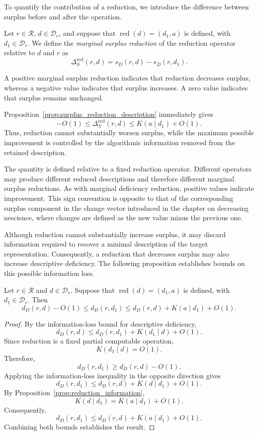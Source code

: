 To quantify the contribution of a reduction, we introduce the difference between surplus before and after the operation.

\begin{definition}
\label{def:marginal_surplus_reduction}
Let $r\in\mathcal R$, $d\in\mathcal D_r$, and suppose that $\operatorname{red}(d)=(d_1,a)$ is defined, with $d_1\in\mathcal D_r$. We define the \emph{marginal surplus reduction}  of the reduction operator relative to $d$ and $r$ as
\[
\Delta_S^{\mathrm{red}}(r,d) = s_D(r,d)-s_D(r,d_1).
\]
\end{definition}

A positive marginal surplus reduction indicates that reduction decreases surplus, whereas a negative value indicates that surplus increases. A zero value indicates that surplus remains unchanged.

Proposition~\ref{prop:surplus_reduction_description} immediately gives
\[
-O(1) \leq \Delta_S^{\mathrm{red}}(r,d) \leq K(a\mid d_1)+O(1).
\]
Thus, reduction cannot substantially worsen surplus, while the maximum possible improvement is controlled by the algorithmic information removed from the retained description.

The quantity is defined relative to a fixed reduction operator. Different operators may produce different reduced descriptions and therefore different marginal surplus reductions. As with marginal deficiency reduction, positive values indicate improvement. This sign convention is opposite to that of the corresponding surplus component in the change vector introduced in the chapter on decreasing nescience, where changes are defined as the new value minus the previous one.

Although reduction cannot substantially increase surplus, it may discard information required to recover a minimal description of the target representation. Consequently, a reduction that decreases surplus may also increase descriptive deficiency. The following proposition establishes bounds on this possible information loss.

\begin{proposition}
\label{prop:reduction_deficiency_bound}
Let $r\in\mathcal R$ and $d\in\mathcal D_r$. Suppose that $\operatorname{red}(d)=(d_1,a)$ is defined, with $d_1\in\mathcal D_r$. Then
\[
d_D(r,d)-O(1) \leq d_D(r,d_1) \leq d_D(r,d)+K(a\mid d_1)+O(1).
\]
\end{proposition}
\begin{proof}
By the information-loss bound for descriptive deficiency,
\[
d_D(r,d) \leq d_D(r,d_1)+K(d_1\mid d)+O(1).
\]
Since reduction is a fixed partial computable operation,
\[
K(d_1\mid d)=O(1).
\]
Therefore,
\[
d_D(r,d_1)\geq d_D(r,d)-O(1).
\]
Applying the information-loss inequality in the opposite direction gives
\[
d_D(r,d_1) \leq d_D(r,d)+K(d\mid d_1)+O(1).
\]
By Proposition~\ref{prop:reduction_information},
\[
K(d\mid d_1)=K(a\mid d_1)+O(1).
\]
Consequently,
\[
d_D(r,d_1) \leq d_D(r,d)+K(a\mid d_1)+O(1).
\]
Combining both bounds establishes the result.
\end{proof}


